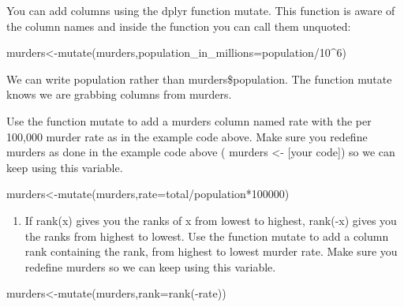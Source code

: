 \documentclass[
]{article}
\newenvironment{Shaded}{\begin{snugshade}}{\end{snugshade}}
\newcommand{\AttributeTok}[1]{\textcolor[rgb]{0.77,0.63,0.00}{#1}}
\newcommand{\DecValTok}[1]{\textcolor[rgb]{0.00,0.00,0.81}{#1}}
\newcommand{\FunctionTok}[1]{\textcolor[rgb]{0.00,0.00,0.00}{#1}}
\newcommand{\NormalTok}[1]{#1}
\newcommand{\OtherTok}[1]{\textcolor[rgb]{0.56,0.35,0.01}{#1}}
\newcommand{\SpecialCharTok}[1]{\textcolor[rgb]{0.00,0.00,0.00}{#1}}
\providecommand{\tightlist}{%
  \setlength{\itemsep}{0pt}\setlength{\parskip}{0pt}}
\begin{document}
You can add columns using the dplyr function mutate. This function is
aware of the column names and inside the function you can call them
unquoted:

\begin{Shaded}
\begin{Highlighting}[]
\NormalTok{murders}\OtherTok{\textless{}{-}}\FunctionTok{mutate}\NormalTok{(murders,}\AttributeTok{population\_in\_millions=}\NormalTok{population}\SpecialCharTok{/}\DecValTok{10}\SpecialCharTok{\^{}}\DecValTok{6}\NormalTok{)}
\end{Highlighting}
\end{Shaded}

We can write population rather than murders\$population. The function
mutate knows we are grabbing columns from murders.

Use the function mutate to add a murders column named rate with the per
100,000 murder rate as in the example code above. Make sure you redefine
murders as done in the example code above ( murders \textless- {[}your
code{]}) so we can keep using this variable.

\begin{Shaded}
\begin{Highlighting}[]
\NormalTok{murders}\OtherTok{\textless{}{-}}\FunctionTok{mutate}\NormalTok{(murders,}\AttributeTok{rate=}\NormalTok{total}\SpecialCharTok{/}\NormalTok{population}\SpecialCharTok{*}\DecValTok{100000}\NormalTok{)}
\end{Highlighting}
\end{Shaded}

\begin{enumerate}
\def\labelenumi{\arabic{enumi}.}
\setcounter{enumi}{1}
\tightlist
\item
  If rank(x) gives you the ranks of x from lowest to highest, rank(-x)
  gives you the ranks from highest to lowest. Use the function mutate to
  add a column rank containing the rank, from highest to lowest murder
  rate. Make sure you redefine murders so we can keep using this
  variable.
\end{enumerate}

\begin{Shaded}
\begin{Highlighting}[]
\NormalTok{murders}\OtherTok{\textless{}{-}}\FunctionTok{mutate}\NormalTok{(murders,}\AttributeTok{rank=}\FunctionTok{rank}\NormalTok{(}\SpecialCharTok{{-}}\NormalTok{rate))}
\end{Highlighting}
\end{Shaded}
\end{document}
